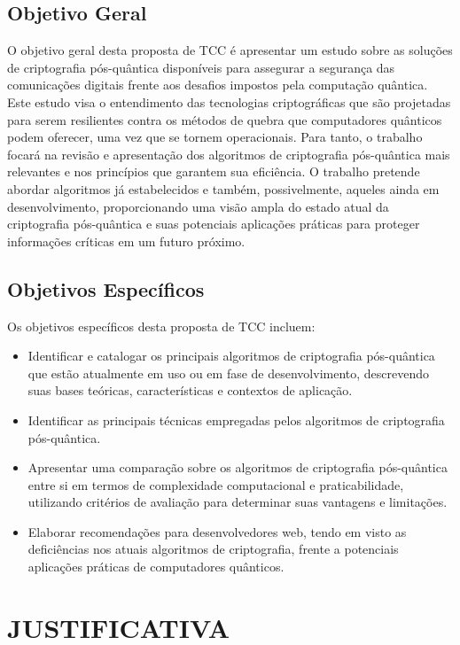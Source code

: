 \subsection{Objetivo Geral}
\label{subsec:objgeral}

O objetivo geral desta proposta de TCC é apresentar um estudo sobre as soluções de criptografia pós-quântica disponíveis para assegurar a segurança das comunicações digitais frente aos desafios impostos pela computação quântica. Este estudo visa o entendimento das tecnologias criptográficas que são projetadas para serem resilientes contra os métodos de quebra que computadores quânticos podem oferecer, uma vez que se tornem operacionais. Para tanto, o trabalho focará na revisão e apresentação dos algoritmos de criptografia pós-quântica mais relevantes e nos princípios que garantem sua eficiência. O trabalho pretende abordar algoritmos já estabelecidos e também, possivelmente, aqueles ainda em desenvolvimento, proporcionando uma visão ampla do estado atual da criptografia pós-quântica e suas potenciais aplicações práticas para proteger informações críticas em um futuro próximo.


\subsection{Objetivos Específicos}
\label{subsec:objespc}

Os objetivos específicos desta proposta de TCC incluem:
\begin{itemize}
	\item Identificar e catalogar os principais algoritmos de criptografia pós-quântica que estão atualmente em uso ou em fase de desenvolvimento, descrevendo suas bases teóricas, características e contextos de aplicação.
	\item Identificar as principais técnicas empregadas pelos algoritmos de criptografia pós-quântica.
	\item Apresentar uma comparação sobre os algoritmos de criptografia pós-quântica entre si em termos de complexidade computacional e praticabilidade, utilizando critérios de avaliação para determinar suas vantagens e limitações.
	\item Elaborar recomendações para desenvolvedores web, tendo em visto as deficiências nos atuais algoritmos de criptografia, frente a potenciais aplicações práticas de computadores quânticos.
\end{itemize}

\section{JUSTIFICATIVA}
\label{sec:justificativa}

